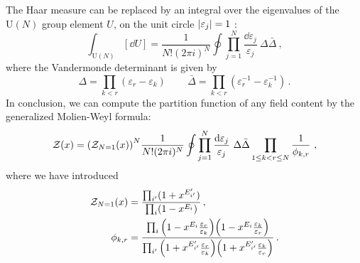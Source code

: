 \documentclass[a4paper,11pt]{article}
\begin{document}
The Haar measure can be replaced by an integral over the eigenvalues of the $\text{U}(N)$ group element $U$, on the unit circle $\abs{\varepsilon_j}=1$ \cite{Weyl:1939}:
% 
\begin{equation}
	\int_{\text{U}(N)}\left[ \dd U\right] = \frac{1}{N! (2\pi i)^N} \oint \prod_{j=1}^N \frac{\dd \varepsilon_j}{\varepsilon_j} \ \Delta\bar{\Delta} \ ,
\end{equation}
% 
where the Vandermonde determinant is given by 
\begin{equation}
 \Delta = \prod_{k<r} (\varepsilon_r-\varepsilon_k)\,\qquad\bar{\Delta} = \prod_{k<r} (\varepsilon_r^{-1}-\varepsilon_k^{-1})\,.
\end{equation}
% 
In conclusion, we can compute the partition function of any field content by the generalized Molien-Weyl formula:
%
\begin{equation}\label{eq:Molien_Weyl_alternative}
	\mathcal{Z}(x) = \qty(\mathcal{Z}_{N=1}(x))^N   \frac{1}{N! (2\pi i)^N} \oint \prod_{j=1}^N \frac{\dd \varepsilon_j}{\varepsilon_j} \ \Delta\bar{\Delta}  \prod_{1\leq k<r \leq N} \frac{1}{\phi_{k,r}}\ ,
\end{equation}
%
where we have introduced
% 
\begin{align}
	\mathcal{Z}_{N=1}(x) &= \frac{\prod_{i'} (1+x^{E_{i'}'})}{\prod_i (1-x^{E_i})} \, ,\\
	\phi_{k,r} &=  \frac{\prod_i \qty(1-x^{E_i}\frac{\varepsilon_r}{\varepsilon_k})\qty(1-x^{E_i}\frac{\varepsilon_k}{\varepsilon_r})}{\prod_{i'} \qty(1+x^{E_{i'}'}\frac{\varepsilon_r}{\varepsilon_k})\qty(1+x^{E_{i'}'}\frac{\varepsilon_k}{\varepsilon_r})} \, .
\end{align}
\end{document}
